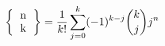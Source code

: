 $$ 
\left \{
  \begin{tabular}{c}
  n \\
  k
  \end{tabular}
\right \} = \frac{1}{k!}\sum_{j=0}^{k} (-1)^{k-j} \binom{k}{j} j^n
$$
